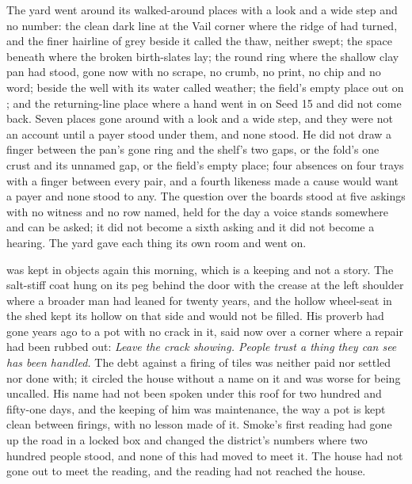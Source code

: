 The yard went around its walked-around places with a look and a wide step and no number: the clean dark line at the Vail corner where the ridge of  had turned, and the finer hairline of grey beside it called the thaw, neither swept; the space beneath  where the broken birth-slates lay; the round ring where the shallow clay pan had stood, gone now with no scrape, no crumb, no print, no chip and no word;  beside the well with its water called weather; the field's empty place out on ; and the returning-line place where a hand went in on Seed 15 and did not come back. Seven places gone around with a look and a wide step, and they were not an account until a payer stood under them, and none stood. He did not draw a finger between the pan's gone ring and the shelf's two gaps, or the fold's one crust and its unnamed gap, or the field's empty place; four absences on four trays with a finger between every pair, and a fourth likeness made a cause would want a payer and none stood to any. The question over the boards stood at five askings with no witness and no row named, held for the day a voice stands somewhere and can be asked; it did not become a sixth asking and it did not become a hearing. The yard gave each thing its own room and went on.

 was kept in objects again this morning, which is a keeping and not a story. The salt-stiff coat hung on its peg behind the door with the crease at the left shoulder where a broader man had leaned for twenty years, and the hollow wheel-seat in the shed kept its hollow on that side and would not be filled. His proverb had gone years ago to a pot with no crack in it, said now over a corner where a repair had been rubbed out: \emph{Leave the crack showing. People trust a thing they can see has been handled.} The debt against a firing of tiles was neither paid nor settled nor done with; it circled the house without a name on it and was worse for being uncalled. His name had not been spoken under this roof for two hundred and fifty-one days, and the keeping of him was maintenance, the way a pot is kept clean between firings, with no lesson made of it. Smoke's first reading had gone up the road in a locked box and changed the district's numbers where two hundred people stood, and none of this had moved to meet it. The house had not gone out to meet the reading, and the reading had not reached the house.

\scenebreak

